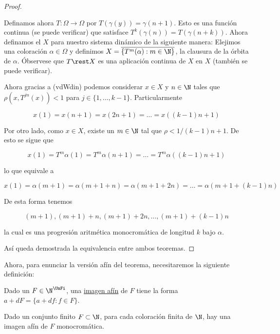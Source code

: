 \begin{proof}
\begin{itemize}
        Definamos ahora $T: \Omega \rightarrow \Omega$ por $T(\gamma(y)) = \gamma(n+1)$. Esto es una función continua (se puede verificar) que satisface $T^k(\gamma(n)) = T(\gamma(n+k))$. Ahora definamos el $X$ para nuestro sistema dinámico de la siguiente manera: Elejimos una coloración $\alpha \in \Omega$ y definimos $X = \overline{\{ T^m(\alpha) : m \in \N \}}$, la clausura de la órbita de $\alpha$. Óbservese que $T \rest X$ es una aplicación continua de $X$ en $X$ (también se puede verificar).
        
        Ahora gracias a (vdWdin) podemos considerar $x \in X$ y $n \in \N$ tales que $\rho(x, T^{jn}(x)) < 1$ para $j \in \{1, \dots, k-1\}$. Particularmente
        
        \[
        x(1) = x(n+1) = x(2n+1) = \dots = x((k-1)n+1)
        \]
        
        Por otro lado, como $x \in X$, existe un $m \in \N$ tal que $\rho < 1/(k-1)n+1$. De esto se sigue que
        
        
        \[
        x(1) = T^m\alpha(1) = T^m\alpha(n+1) = \dots = T^m\alpha((k-1)n+1) 
        \]
        
        \noindent lo que equivale a
        
        \[
        x(1) = \alpha(m+1) = \alpha(m+1+n) = \alpha(m+1+2n) = \dots = \alpha(m+1+(k-1)n)
        \]
        
        De esta forma tenemos
        
        \[
        (m+1), (m+1)+n, (m+1)+2n, \dots, (m+1)+(k-1)n
        \]
        
        \noindent la cual es una progresión aritmética monocromática de longitud $k$ bajo $\alpha$.
    \end{itemize}
    
    Así queda demostrada la equivalencia entre ambos teoremas.
\end{proof}

Ahora, para enunciar la versión afín del teorema, necesitaremos la siguiente definición:

\begin{defn}
    Dado un $F \in \N^{\UnFi}$, una \ul{imagen afín} de $F$ tiene la forma $a + dF = \{ a + df : f \in F \}$.
\end{defn}

\begin{teo}[vdWaf]
    Dado un conjunto finito $F \subset \N$, para cada coloración finita de $\N$, hay una imagen afín de $F$ monocromática.
\end{teo}

